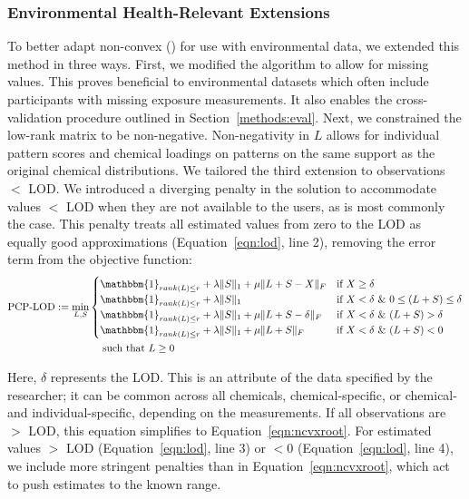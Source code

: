 \subsubsection{Environmental Health-Relevant Extensions} 

To better adapt non-convex \rootpcp (\ncpcpc) for use with environmental data, we extended this method in three ways. First, we modified the algorithm to allow for missing values. This proves beneficial to environmental datasets which often include participants with missing exposure measurements. It also enables the cross-validation procedure outlined in Section~\ref{methods:eval}. Next, we constrained the low-rank matrix to be non-negative. Non-negativity in $L$ allows for individual pattern scores and chemical loadings on patterns on the same support as the original chemical distributions. We tailored the third extension to observations $<$ LOD. We introduced a diverging penalty in the \ncpcp solution to accommodate values $<$ LOD when they are not available to the users, as is most commonly the case. This penalty treats all estimated values from zero to the LOD as equally good approximations (Equation~\ref{eqn:lod}, line 2), removing the error term from the objective function: 
\begin{equation}\label{eqn:lod}
\begin{aligned}
\text{PCP-LOD} := \min _{L, S} &
  \begin{cases}
  \mathbbm{1}_{rank(L) \le r} + \lambda\|S\|_{1} + \mu\|L+S-X\|_{F} 
  & \text{if } X \ge \delta \\
  \mathbbm{1}_{rank(L) \le r} + \lambda\|S\|_{1} 
  & \text{if } X < \delta \ \& \ 0 \le (L+S) \le \delta \\
  \mathbbm{1}_{rank(L) \le r} + \lambda\|S\|_{1} + \mu\|L+S-\delta\|_{F} 
  & \text{if } X < \delta \ \& \ (L+S) > \delta\\
  \mathbbm{1}_{rank(L) \le r} + \lambda\|S\|_{1} + \mu\|L+S\|_{F} 
  & \text{if } X < \delta \ \& \ (L+S) < 0 \\
  \end{cases} \\
  & \hspace{3ex} \text{such that } L \ge 0
\end{aligned}
\end{equation}

\noindent Here, $\delta$ represents the LOD. This is an attribute of the data specified by the researcher; it can be common across all chemicals, chemical-specific, or chemical- and individual-specific, depending on the measurements. If all observations are $>$ LOD, this equation simplifies to Equation~\ref{eqn:ncvxroot}. For estimated values $>$ LOD (Equation~\ref{eqn:lod}, line 3) or $<0$ (Equation~\ref{eqn:lod}, line 4), we include more stringent penalties than in Equation~\ref{eqn:ncvxroot}, which act to push estimates to the known range. 

